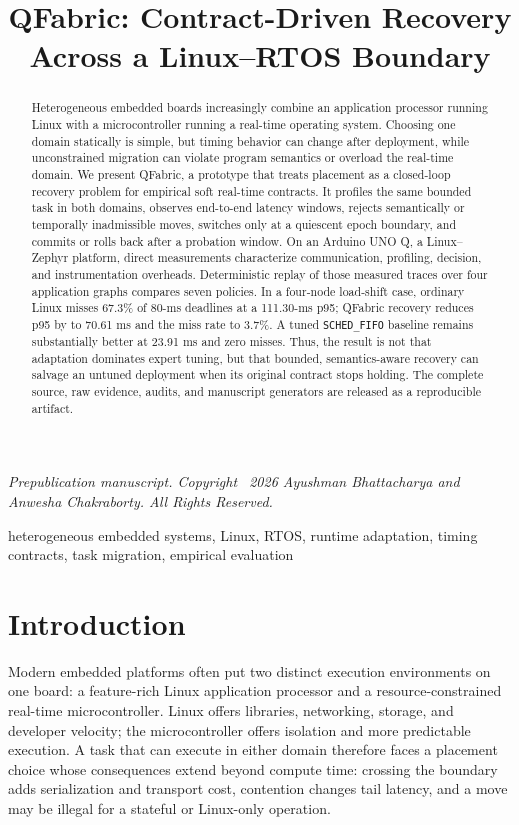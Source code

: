 \documentclass[conference]{IEEEtran}
\title{QFabric: Contract-Driven Recovery Across a Linux--RTOS Boundary}
\author{\IEEEauthorblockN{Ayushman Bhattacharya}
\IEEEauthorblockA{\textit{Pollinations AI}\\
\href{mailto:ayushman.elixpo@gmail.com}{ayushman.elixpo@gmail.com}}
\and
\IEEEauthorblockN{Anwesha Chakraborty}
\IEEEauthorblockA{\textit{Dept. CSE, JIS University}\\
\href{mailto:anwesha.elixpo@gmail.com}{anwesha.elixpo@gmail.com}}}
\newcommand{\system}{QFabric\xspace}
\begin{document}
\maketitle

\begin{center}
\footnotesize\textit{Prepublication manuscript. Copyright \textcopyright\ 2026
Ayushman Bhattacharya and Anwesha Chakraborty. All Rights Reserved.}
\end{center}

\begin{abstract}
Heterogeneous embedded boards increasingly combine an application processor
running Linux with a microcontroller running a real-time operating system.
Choosing one domain statically is simple, but timing behavior can change after
deployment, while unconstrained migration can violate program semantics or
overload the real-time domain. We present \system, a prototype that treats
placement as a closed-loop recovery problem for empirical soft real-time
contracts. It profiles the same bounded task in both domains, observes
end-to-end latency windows, rejects semantically or temporally inadmissible
moves, switches only at a quiescent epoch boundary, and commits or rolls back
after a probation window. On an Arduino UNO Q, a Linux--Zephyr platform, direct
measurements characterize communication, profiling, decision, and
instrumentation overheads. Deterministic replay of those measured traces over
four application graphs compares seven policies. In a four-node load-shift
case, ordinary Linux misses 67.3\% of 80-ms deadlines at a 111.30-ms p95;
\system recovery reduces p95 by \RecoveryImprovement to 70.61 ms and the miss
rate to 3.7\%. A tuned \texttt{SCHED\_FIFO} baseline remains substantially
better at 23.91 ms and zero misses. Thus, the result is not that adaptation
dominates expert tuning, but that bounded, semantics-aware recovery can salvage
an untuned deployment when its original contract stops holding. The complete
source, raw evidence, audits, and manuscript generators are released as a
reproducible artifact.
\end{abstract}

\begin{IEEEkeywords}
heterogeneous embedded systems, Linux, RTOS, runtime adaptation, timing
contracts, task migration, empirical evaluation
\end{IEEEkeywords}

\section{Introduction}
Modern embedded platforms often put two distinct execution environments on one
board: a feature-rich Linux application processor and a resource-constrained
real-time microcontroller. Linux offers libraries, networking, storage, and
developer velocity; the microcontroller offers isolation and more predictable
execution. A task that can execute in either domain therefore faces a placement
choice whose consequences extend beyond compute time: crossing the boundary
adds serialization and transport cost, contention changes tail latency, and a
move may be illegal for a stateful or Linux-only operation.
\end{document}
